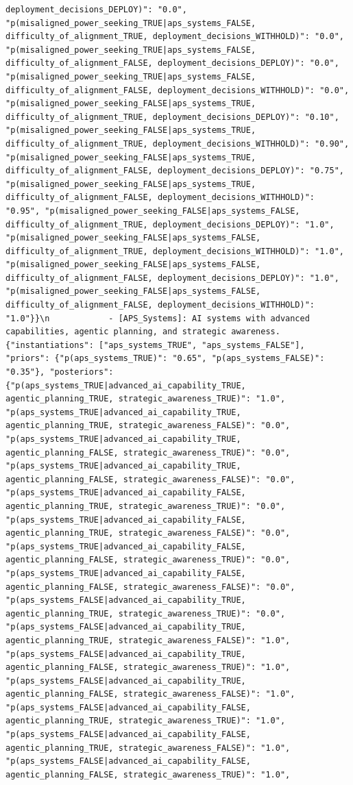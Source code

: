 \documentclass[
  11pt,
  letterpaper,
]{book}
\begin{document}
\begin{verbatim}
deployment_decisions_DEPLOY)": "0.0", "p(misaligned_power_seeking_TRUE|aps_systems_FALSE, difficulty_of_alignment_TRUE, deployment_decisions_WITHHOLD)": "0.0", "p(misaligned_power_seeking_TRUE|aps_systems_FALSE, difficulty_of_alignment_FALSE, deployment_decisions_DEPLOY)": "0.0", "p(misaligned_power_seeking_TRUE|aps_systems_FALSE, difficulty_of_alignment_FALSE, deployment_decisions_WITHHOLD)": "0.0", "p(misaligned_power_seeking_FALSE|aps_systems_TRUE, difficulty_of_alignment_TRUE, deployment_decisions_DEPLOY)": "0.10", "p(misaligned_power_seeking_FALSE|aps_systems_TRUE, difficulty_of_alignment_TRUE, deployment_decisions_WITHHOLD)": "0.90", "p(misaligned_power_seeking_FALSE|aps_systems_TRUE, difficulty_of_alignment_FALSE, deployment_decisions_DEPLOY)": "0.75", "p(misaligned_power_seeking_FALSE|aps_systems_TRUE, difficulty_of_alignment_FALSE, deployment_decisions_WITHHOLD)": "0.95", "p(misaligned_power_seeking_FALSE|aps_systems_FALSE, difficulty_of_alignment_TRUE, deployment_decisions_DEPLOY)": "1.0", "p(misaligned_power_seeking_FALSE|aps_systems_FALSE, difficulty_of_alignment_TRUE, deployment_decisions_WITHHOLD)": "1.0", "p(misaligned_power_seeking_FALSE|aps_systems_FALSE, difficulty_of_alignment_FALSE, deployment_decisions_DEPLOY)": "1.0", "p(misaligned_power_seeking_FALSE|aps_systems_FALSE, difficulty_of_alignment_FALSE, deployment_decisions_WITHHOLD)": "1.0"}}\n            - [APS_Systems]: AI systems with advanced capabilities, agentic planning, and strategic awareness. {"instantiations": ["aps_systems_TRUE", "aps_systems_FALSE"], "priors": {"p(aps_systems_TRUE)": "0.65", "p(aps_systems_FALSE)": "0.35"}, "posteriors": {"p(aps_systems_TRUE|advanced_ai_capability_TRUE, agentic_planning_TRUE, strategic_awareness_TRUE)": "1.0", "p(aps_systems_TRUE|advanced_ai_capability_TRUE, agentic_planning_TRUE, strategic_awareness_FALSE)": "0.0", "p(aps_systems_TRUE|advanced_ai_capability_TRUE, agentic_planning_FALSE, strategic_awareness_TRUE)": "0.0", "p(aps_systems_TRUE|advanced_ai_capability_TRUE, agentic_planning_FALSE, strategic_awareness_FALSE)": "0.0", "p(aps_systems_TRUE|advanced_ai_capability_FALSE, agentic_planning_TRUE, strategic_awareness_TRUE)": "0.0", "p(aps_systems_TRUE|advanced_ai_capability_FALSE, agentic_planning_TRUE, strategic_awareness_FALSE)": "0.0", "p(aps_systems_TRUE|advanced_ai_capability_FALSE, agentic_planning_FALSE, strategic_awareness_TRUE)": "0.0", "p(aps_systems_TRUE|advanced_ai_capability_FALSE, agentic_planning_FALSE, strategic_awareness_FALSE)": "0.0", "p(aps_systems_FALSE|advanced_ai_capability_TRUE, agentic_planning_TRUE, strategic_awareness_TRUE)": "0.0", "p(aps_systems_FALSE|advanced_ai_capability_TRUE, agentic_planning_TRUE, strategic_awareness_FALSE)": "1.0", "p(aps_systems_FALSE|advanced_ai_capability_TRUE, agentic_planning_FALSE, strategic_awareness_TRUE)": "1.0", "p(aps_systems_FALSE|advanced_ai_capability_TRUE, agentic_planning_FALSE, strategic_awareness_FALSE)": "1.0", "p(aps_systems_FALSE|advanced_ai_capability_FALSE, agentic_planning_TRUE, strategic_awareness_TRUE)": "1.0", "p(aps_systems_FALSE|advanced_ai_capability_FALSE, agentic_planning_TRUE, strategic_awareness_FALSE)": "1.0", "p(aps_systems_FALSE|advanced_ai_capability_FALSE, agentic_planning_FALSE, strategic_awareness_TRUE)": "1.0", 
\end{verbatim}
\end{document}
